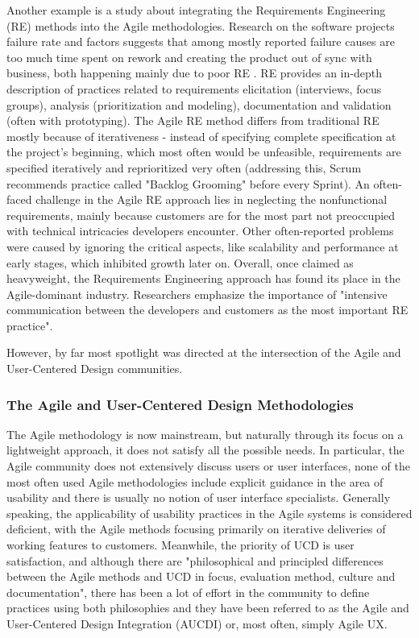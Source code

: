 \documentclass{article}
\begin{document}
Another example is a study about integrating the Requirements Engineering (RE) methods into the Agile methodologies. Research on the software projects failure rate and factors suggests that among mostly reported failure causes are too much time spent on rework and creating the product out of sync with business, both happening mainly due to poor RE \citep{arcidiacono2017comparative}. RE provides an in-depth description of practices related to requirements elicitation (interviews, focus groups), analysis (prioritization and modeling), documentation and validation (often with prototyping). The Agile RE method differs from traditional RE mostly because of iterativeness - instead of specifying complete specification at the project's beginning, which most often would be unfeasible, requirements are specified iteratively and reprioritized very often (addressing this, Scrum recommends practice called "Backlog Grooming" before every Sprint\citep{rubin2012essential}). An often-faced challenge in the Agile RE approach lies in neglecting the nonfunctional requirements, mainly because customers are for the most part not preoccupied with technical intricacies developers encounter. Other often-reported problems were caused by ignoring the critical aspects,  like scalability and performance at early stages, which inhibited growth later on. Overall, once claimed as heavyweight, the Requirements Engineering approach has found its place in the Agile-dominant industry. Researchers emphasize the importance of "intensive communication between the developers and customers as the most important RE practice". \citep{paetsch2003requirements} \citep{cao2008agile} 

However, by far most spotlight was directed at the intersection of the Agile and User-Centered Design communities.

\subsubsection{The Agile and User-Centered Design Methodologies}
The Agile methodology is now mainstream, but naturally through its focus on a lightweight approach, it does not satisfy all the possible needs. In particular, the Agile community does not extensively discuss users or user interfaces, none of the most often used Agile methodologies include explicit guidance in the area of usability and there is usually no notion of user interface specialists. Generally speaking, the applicability of usability practices in the Agile systems is considered deficient, with the Agile methods focusing primarily on iterative deliveries of working features to customers. Meanwhile, the priority of UCD is user satisfaction, and although there are "philosophical and principled differences between the Agile methods and UCD in focus, evaluation method, culture and documentation", there has been a lot of effort in the community to define practices using both philosophies and they have been referred to as the Agile and User-Centered Design Integration (AUCDI) or, most often, simply Agile UX. \citep{salah2014systematic}\citep{jurca2014integrating}
\end{document}
